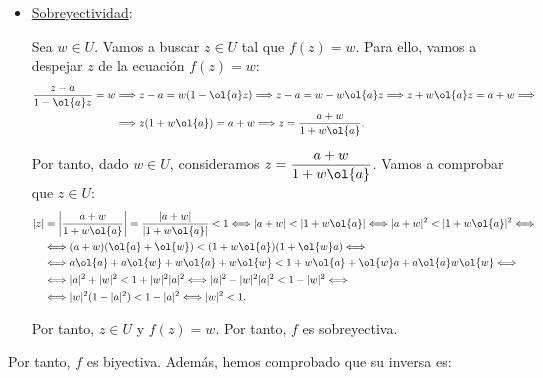 \begin{ejercicio}
\begin{itemize}
        \item \ul{Sobreyectividad}:
        
        Sea $w \in U$. Vamos a buscar $z \in U$ tal que $f(z) = w$. Para ello, vamos a despejar $z$ de la ecuación $f(z) = w$:
        \begin{align*}
            \dfrac{z-a}{1-\ol{a}z} = w &\Longrightarrow
            z-a = w(1-\ol{a}z) \Longrightarrow
            z-a = w - w\ol{a}z \Longrightarrow
            z + w\ol{a}z = a + w \Longrightarrow\\&\Longrightarrow
            z(1+w\ol{a}) = a + w \Longrightarrow
            z = \dfrac{a+w}{1+w\ol{a}}.
        \end{align*}

        Por tanto, dado $w \in U$, consideramos $z = \dfrac{a+w}{1+w\ol{a}}$. Vamos a comprobar que $z \in U$:
        \begin{align*}
            |z| &= \left|\dfrac{a+w}{1+w\ol{a}}\right| = \dfrac{|a+w|}{|1+w\ol{a}|} < 1 \Longleftrightarrow
            |a+w| < |1+w\ol{a}| \Longleftrightarrow
            |a+w|^2 < |1+w\ol{a}|^2 \Longleftrightarrow \\&\Longleftrightarrow
            (a+w)(\ol{a}+\ol{w}) < (1+w\ol{a})(1+\ol{w}a) \Longleftrightarrow \\&\Longleftrightarrow
            a\ol{a} + a\ol{w} + w\ol{a} + w\ol{w} < 1 + w\ol{a} + \ol{w}a + a\ol{a}w\ol{w} \Longleftrightarrow \\&\Longleftrightarrow
            |a|^2 + |w|^2 < 1 + |w|^2|a|^2 \Longleftrightarrow
            |a|^2 - |w|^2|a|^2 < 1 - |w|^2 \Longleftrightarrow \\&\Longleftrightarrow
            |w|^2(1-|a|^2) < 1 - |a|^2 \Longleftrightarrow
            |w|^2 < 1.
        \end{align*}

        Por tanto, $z \in U$ y $f(z) = w$. Por tanto, $f$ es sobreyectiva.
    \end{itemize}

    Por tanto, $f$ es biyectiva. Además, hemos comprobado que su inversa es:
\end{ejercicio}

